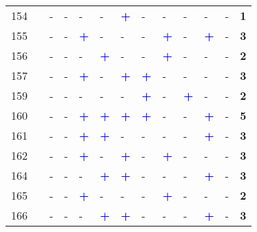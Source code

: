 \begin{longtable}{p{0.5cm}p{4.6cm}p{0.3cm}p{0.3cm}p{0.3cm}p{0.3cm}p{0.3cm}p{0.3cm}p{0.3cm}p{0.3cm}p{0.3cm}p{0.3cm}p{1cm}}
    \small{154} & \small{\textcite{nigro_land_2019}} & - & - & - & - & \textcolor{blue}{\textbf{+}} & - & - & - & - & - & \textbf{1}\\
    \small{155} & \small{\textcite{oostendorp_combining_2018}}\index{Oostendorp, Rebekka|pagebf} & - & - & \textcolor{blue}{\textbf{+}} & - & - & - & \textcolor{blue}{\textbf{+}} & - & \textcolor{blue}{\textbf{+}} & - & \textbf{3}\\
    \small{156} & \small{\textcite{pages_les_2021}}\index{Pages, Thibaud|pagebf} & - & - & - & \textcolor{blue}{\textbf{+}} & - & - & \textcolor{blue}{\textbf{+}} & - & - & - & \textbf{2}\\
    \small{157} & \small{\textcite{pan_intermodal_2010}}\index{Pan, Haixiao|pagebf} & - & - & \textcolor{blue}{\textbf{+}} & - & \textcolor{blue}{\textbf{+}} & \textcolor{blue}{\textbf{+}} & - & - & - & - & \textbf{3}\\
    \small{159} & \small{\textcite{papon_evaluation_2017}}\index{Papon, Francis|pagebf} & - & - & - & - & - & \textcolor{blue}{\textbf{+}} & - & \textcolor{blue}{\textbf{+}} & - & - & \textbf{2}\\
    \small{160} & \small{\textcite{papon_rapport_2015}}\index{Papon, Francis|pagebf} & - & - & \textcolor{blue}{\textbf{+}} & \textcolor{blue}{\textbf{+}} & \textcolor{blue}{\textbf{+}} & \textcolor{blue}{\textbf{+}} & - & - & \textcolor{blue}{\textbf{+}} & - & \textbf{5}\\
    \small{161} & \small{\textcite{park_first-last-mile_2021}}\index{Park, Keunhyun|pagebf} & - & - & \textcolor{blue}{\textbf{+}} & \textcolor{blue}{\textbf{+}} & - & - & - & - & \textcolor{blue}{\textbf{+}} & - & \textbf{3}\\
    \small{162} & \small{\textcite{park_finding_2014}}\index{Park, Sungjin|pagebf} & - & - & \textcolor{blue}{\textbf{+}} & - & \textcolor{blue}{\textbf{+}} & - & \textcolor{blue}{\textbf{+}} & - & - & - & \textbf{3}\\
    \small{164} & \small{\textcite{qiu_interplay_2021}}\index{Qiu, Waishan|pagebf} & - & - & - & \textcolor{blue}{\textbf{+}} & \textcolor{blue}{\textbf{+}} & - & - & - & \textcolor{blue}{\textbf{+}} & - & \textbf{3}\\
    \small{165} & \small{\textcite{quarshie_integrating_2007}}\index{Quarshie, Magnus|pagebf} & - & - & \textcolor{blue}{\textbf{+}} & - & - & - & \textcolor{blue}{\textbf{+}} & - & - & - & \textbf{2}\\
    \small{166} & \small{\textcite{rabaud_quand_2022}}\index{Rabaud, Mathieu|pagebf} & - & - & - & \textcolor{blue}{\textbf{+}} & \textcolor{blue}{\textbf{+}} & - & - & - & \textcolor{blue}{\textbf{+}} & - & \textbf{3}\\

\end{longtable}
